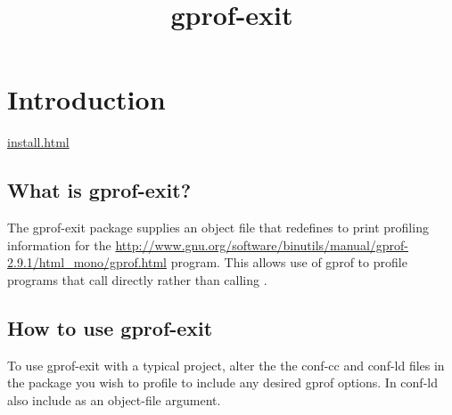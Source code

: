 \documentclass{book}
\title{gprof-exit}
\begin{document}
\section{Introduction}
\href{How to install gprof-exit}{install.html}

\subsection{What is gprof-exit?}
The gprof-exit package supplies an object file that redefines 
to print profiling information for the
\href{gprof}{http://www.gnu.org/software/binutils/manual/gprof-2.9.1/html_mono/gprof.html}
program.  This allows use of gprof to profile programs that call
 directly rather than calling .

\subsection{How to use gprof-exit}
To use gprof-exit with a typical  project, alter the the
conf-cc and conf-ld files in the package you wish to profile to include
any desired gprof options.  In conf-ld also include
as an object-file argument.
\end{document}
